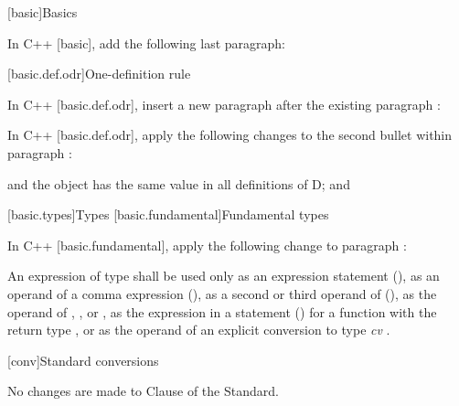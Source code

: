 
[basic]{Basics}

\pnum
In C++ [basic], add the following last paragraph:

\begin{std.txt}
\end{std.txt}



\setcounter{section}{1}
[basic.def.odr]{One-definition rule}

\pnum
In C++ [basic.def.odr], insert a new paragraph after the existing paragraph :

\begin{std.txt}
\end{std.txt}

\pnum
In C++ [basic.def.odr], apply the following changes to the second bullet within paragraph :

\begin{std.txt}
and the object has the same value in all definitions of D; and
\end{std.txt}

\setcounter{section}{8}
[basic.types]{Types}
[basic.fundamental]{Fundamental types}

\pnum
In C++ [basic.fundamental], apply the following change to paragraph :

\begin{std.txt}
An expression of type  shall be used only as an expression
statement (), as an operand of a comma expression
(), as a second or
third operand of  (), as the operand of ,
,  or , as the
expression in a  statement () for a function with the return type
, or as the operand of an explicit conversion to type
\emph{cv} .
\end{std.txt}

[conv]{Standard conversions}

No changes are made to Clause \the\value{chapter} of the \Cpp Standard.
